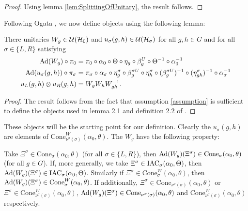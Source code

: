 \documentclass[11pt,a4paper,twoside]{article}
\numberwithin{equation}{section}
\begin{document}
	\begin{proof}
		Using lemma \ref{lem:SplittingOfUnitary}, the result follows.
	\end{proof}
	Following Ogata \cite{ogata2021h3gmathbb}, we now define objects using the following lemma:
	\begin{lemma}\label{lem:Definition_W_And_u}
		There unitaries $W_g\in\mathcal U(\mathcal H_0)$ and $u_{\sigma}(g,h)\in\mathcal U(\mathcal H_{\sigma})$ for all $g,h\in G$ and for all $\sigma\in\{L,R\}$ satisfying
		\begin{align}
			\Ad{W_g}\circ\pi_0&=\pi_0\circ\alpha_0\circ\Theta\circ\eta_g\circ\beta_g^U\circ\Theta^{-1}\circ\alpha_0^{-1}\\
			\Ad{u_\sigma(g,h)}\circ\pi_\sigma&=\pi_\sigma\circ\alpha_\sigma\circ\eta_g^\sigma\circ\beta_g^{\sigma U}\circ\eta_h^{\sigma}\circ(\beta_g^{\sigma U})^{-1}\circ(\eta^\sigma_{gh})^{-1}\circ\alpha_\sigma^{-1}\\
			u_L(g,h)\otimes u_R(g,h)&=W_gW_hW_{gh}^{-1}.
		\end{align}
	\end{lemma}
	\begin{proof}
		The result follows from the fact that assumption \ref{assumption} is sufficient to define the objects used in lemma 2.1 and definition 2.2 of \cite{ogata2021h3gmathbb}.
	\end{proof}
	These objects will be the starting point for our definition. Clearly the $u_\sigma(g,h)$ are elements of $\textrm{Cone}_{\nu^\sigma(\sigma)}^W(\alpha_0,\theta)$. The $W_g$ have the following property:
	\begin{lemma}\label{lem:AdjointOverConeIsInCone}
		Take $\Xi^{\sigma}\in\textrm{Cone}_\sigma(\alpha_0,\theta)$ (for all $\sigma\in\{L,R\}$), then $\Ad{W_g}(\Xi^\sigma)\in\textrm{Cone}_\sigma(\alpha_0,\theta)$ (for all $g\in G$). If, more generally, we take $\Xi^\sigma\in\textrm{IAC}_\sigma(\alpha_0,\Theta)$, then $\Ad{W_g}(\Xi^\sigma)\in\IAC_\sigma(\alpha_0,\Theta)$. Similarly if $\Xi^{\sigma}\in\textrm{Cone}_\sigma^W(\alpha_0,\theta)$, then $\Ad{W_g}(\Xi^\sigma)\in\textrm{Cone}_\sigma^W(\alpha_0,\theta)$. If additionally, $\Xi^{\sigma}\in\textrm{Cone}_{\nu^\sigma(\sigma)}(\alpha_0,\theta)$ or $\Xi^{\sigma}\in\textrm{Cone}_{\nu^\sigma(\sigma)}^W(\alpha_0,\theta)$, $\Ad{W_g}(\Xi^\sigma)\in\textrm{Cone}_{\nu^\sigma(\sigma)}(\alpha_0,\theta)$ and $\textrm{Cone}_{\nu^\sigma(\sigma)}^W(\alpha_0,\theta)$ respectively.
	\end{lemma}
\end{document}
